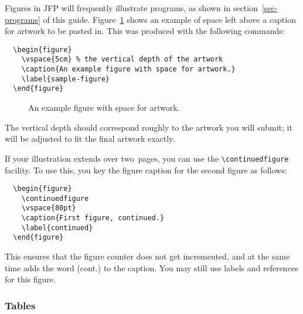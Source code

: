 \documentclass{jfp}
\begin{document}
Figures in JFP will frequently illustrate programs, as shown in
section~\ref{sec-programs} of this guide. Figure~\ref{sample-figure}
shows an example of space left above a caption for artwork to be pasted in.
This was produced with the following commands:
%
\begin{verbatim}
  \begin{figure}
    \vspace{5cm} % the vertical depth of the artwork
    \caption{An example figure with space for artwork.}
    \label{sample-figure}
  \end{figure}
\end{verbatim}
%
\begin{figure}
  \vspace{5cm} %
  \caption{An example figure with space for artwork.}
  \label{sample-figure}
\end{figure}
%
The vertical depth should correspond roughly to the artwork you will submit;
it will be adjusted to fit the final artwork exactly.

If your illustration extends over two~pages, you can use the
\verb"\continuedfigure" facility. To use this, you key the figure
caption for the second figure as follows:
%
\begin{verbatim}
  \begin{figure}
    \continuedfigure
    \vspace{80pt}
    \caption{First figure, continued.}
    \label{continued}
  \end{figure}
\end{verbatim}
%
This ensures that the figure counter does not get incremented, and at the
same time adds the word (cont.) to the caption. You may still use labels
and references for this figure.

\subsubsection{Tables}
\end{document}
